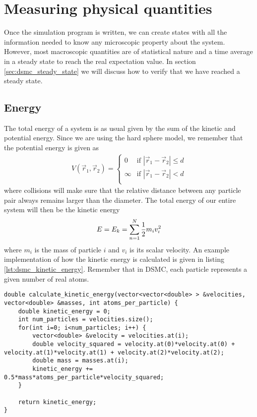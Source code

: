 \section{Measuring physical quantities}
\label{sec:dsmc_measuring_physical_quantities}
Once the simulation program is written, we can create states with all the information needed to know any microscopic property about the system. However, most macroscopic quantities are of statistical nature and 
 a time average in a steady state to reach the real expectation value. In section \ref{sec:dsmc_steady_state} we will discuss how to verify that we have reached a steady state. 
\subsection{Energy}
The total energy of a system is as usual given by the sum of the kinetic and potential energy. Since we are using the hard sphere model, we remember that the potential energy is given as
\begin{align}
	V(\vec r_1, \vec r_2) = \left\{
	\begin{array}{lr}
	0 & \text{if } |\vec r_1  - \vec r_2| \leq d\\
	\infty & \text{if } |\vec r_1  - \vec r_2| < d\\
	\end{array}
	\right .
\end{align}
where collisions will make sure that the relative distance between any particle pair always remains larger than the diameter. The total energy of our entire system will then be the kinetic energy
\begin{align}
	E = E_k = \sum_{n=1}^N {1\over 2}m_iv_i^2
\end{align}
where $m_i$ is the mass of particle $i$ and $v_i$ is its scalar velocity. An example implementation of how the kinetic energy is calculated is given in listing \ref{lst:dsmc_kinetic_energy}. Remember that in DSMC, each particle represents a given number of real atoms.

\begin{lstlisting}[caption=Calculation of kinetic energy., label=lst:dsmc_kinetic_energy]
double calculate_kinetic_energy(vector<vector<double> > &velocities, vector<double> &masses, int atoms_per_particle) {
	double kinetic_energy = 0;
	int num_particles = velocities.size();
	for(int i=0; i<num_particles; i++) {
		vector<double> &velocity = velocities.at(i);
		double velocity_squared = velocity.at(0)*velocity.at(0) + velocity.at(1)*velocity.at(1) + velocity.at(2)*velocity.at(2);
		double mass = masses.at(i);
		kinetic_energy += 0.5*mass*atoms_per_particle*velocity_squared;
	}

	return kinetic_energy;
}
\end{lstlisting}

